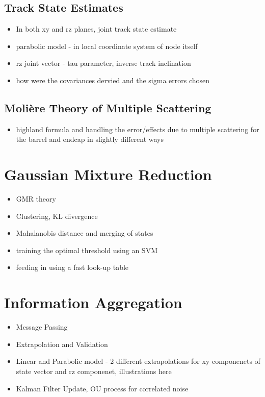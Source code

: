 \subsection{Track State Estimates}
\begin{itemize}
\item In both xy and rz planes, joint track state estimate
\item parabolic model - in local coordinate system of node itself
\item rz joint vector - tau parameter, inverse track inclination
\item how were the covariances dervied and the sigma errors chosen
\end{itemize}

\subsection{Molière Theory of Multiple Scattering}
\begin{itemize}
\item highland formula and handling the error/effects due to multiple scattering for the barrel and endcap in slightly different ways
\end{itemize}



\section{Gaussian Mixture Reduction}
\begin{itemize}
    \item GMR theory
    \item Clustering, KL divergence
    \item Mahalanobis distance and merging of states
    \item training the optimal threshold using an SVM
    \item feeding in using a fast look-up table
\end{itemize}



\section{Information Aggregation}
\begin{itemize}
    \item Message Passing
    \item Extrapolation and Validation
    \item Linear and Parabolic model - 2 different extrapolations for xy componenets of state vector and rz componenet, illustrations here
    \item Kalman Filter Update, OU process for correlated noise
\end{itemize}



